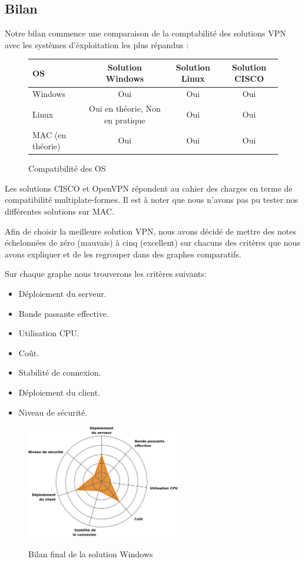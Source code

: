 \subsection{Bilan}

Notre bilan commence une comparaison de la comptabilité des solutions VPN avec les systèmes d'éxploitation les plus répandus :

\begin{figure}[H]
	\begin{center}
\begin{tabular}{l|c|c|c}
OS & Solution Windows & Solution Linux & Solution CISCO \\
\hline
Windows & Oui & Oui & Oui \\
Linux & Oui en théorie, Non en pratique & Oui & Oui \\
MAC (en théorie) & Oui & Oui & Oui \\
\end{tabular}
	\end{center}
	\caption{Compatibilité des OS}
	\label{Compatibilité_des_OS}
\end{figure}

Les solutions CISCO et OpenVPN répondent au cahier des charges en terme de compatibilité multiplate-formes. Il est à noter que nous n'avons pas pu tester nos différentes solutions sur MAC.

Afin de choisir la meilleure solution VPN, nous avons décidé de mettre des notes échelonnées de zéro (mauvais) à cinq (excellent) sur chacuns des critères que nous avons expliquer et de les regrouper dans des graphes comparatifs.

Sur chaque graphe nous trouverons les critères suivants:
\begin{itemize}
 	\item Déploiement du serveur.
 	\item Bande passante effective.
 	\item Utilisation CPU.
 	\item Coût.
 	\item Stabilité de connexion.
 	\item Déploiement du client.
	\item Niveau de sécurité.
\end{itemize}

\begin{figure}[H]
	\begin{center}
		\includegraphics[width=0.6\textwidth]{partie_3/images/windows.png}\\
	\end{center}
	\caption{Bilan final de la solution Windows}
	\label{Graphe Windows}
\end{figure}

